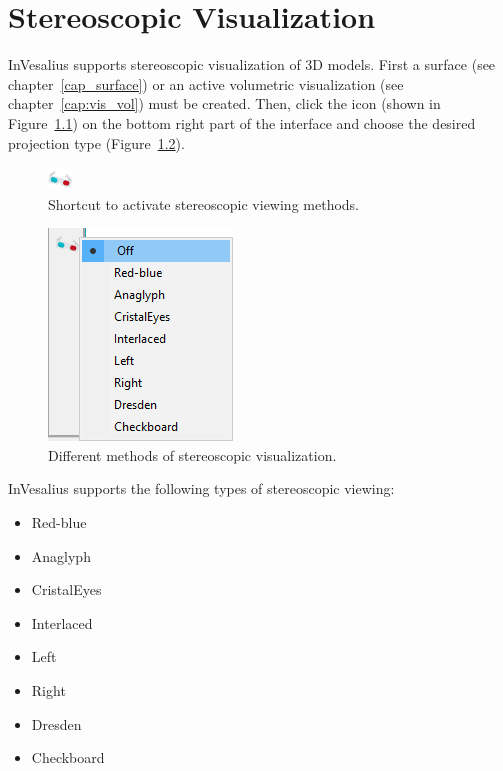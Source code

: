 \chapter{Stereoscopic Visualization}

InVesalius supports stereoscopic visualization of 3D models. First a surface (see chapter~\ref{cap_surface}) or an active volumetric visualization (see chapter~\ref{cap:vis_vol}) must be created. Then, click the icon (shown in Figure~\ref{fig:ster}) on the bottom right part of the interface and choose the desired projection type (Figure~\ref{fig:st_menu}).


\begin{figure}[!htb]
\centering
\includegraphics[scale=0.6]{../user_guide_figures/icons/3D_glasses.png}
\caption{Shortcut to activate stereoscopic viewing methods.}
\label{fig:ster}
\end{figure}

\begin{figure}[!htb]
\centering
\includegraphics[scale=0.4]{../user_guide_figures/invesalius_screen/st_menu_en.png}
\caption{Different methods of stereoscopic visualization.}
\label{fig:st_menu}
\end{figure}

InVesalius supports the following types of stereoscopic viewing:

\begin{itemize}
	\item Red-blue
	\item Anaglyph
	\item CristalEyes
	\item Interlaced
	\item Left
	\item Right
	\item Dresden
	\item Checkboard
\end{itemize}

